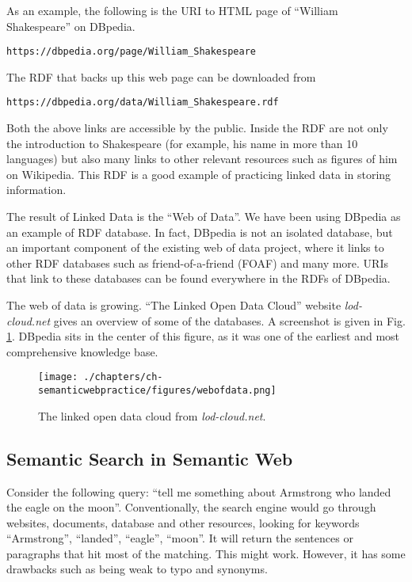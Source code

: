 As an example, the following is the URI to HTML page of ``William Shakespeare'' on DBpedia.
\begin{lstlisting}
https://dbpedia.org/page/William_Shakespeare
\end{lstlisting}
The RDF that backs up this web page can be downloaded from
\begin{lstlisting}
https://dbpedia.org/data/William_Shakespeare.rdf
\end{lstlisting}
Both the above links are accessible by the public. Inside the RDF are not only the introduction to Shakespeare (for example, his name in more than 10 languages) but also many links to other relevant resources such as figures of him on Wikipedia. This RDF is a good example of practicing linked data in storing information.

The result of Linked Data is the ``Web of Data''. We have been using DBpedia as an example of RDF database. In fact, DBpedia is not an isolated database, but an important component of the existing web of data project, where it links to other RDF databases such as friend-of-a-friend (FOAF) and many more. URIs that link to these databases can be found everywhere in the RDFs of DBpedia.

The web of data is growing. ``The Linked Open Data Cloud'' website \textit{lod-cloud.net} gives an overview of some of the databases. A screenshot is given in Fig. \ref{fig:webofdata}. DBpedia sits in the center of this figure, as it was one of the earliest and most comprehensive knowledge base. 
\begin{figure}[htbp]
	\centering
	\texttt{[image: ./chapters/ch-semanticwebpractice/figures/webofdata.png]}
	\caption{The linked open data cloud from \textit{lod-cloud.net}.}
	\label{fig:webofdata}
\end{figure}

\subsection{Semantic Search in Semantic Web}

Consider the following query: ``tell me something about Armstrong who landed the eagle on the moon''. Conventionally, the search engine would go through websites, documents, database and other resources, looking for keywords ``Armstrong'', ``landed'', ``eagle'', ``moon''. It will return the sentences or paragraphs that hit most of the matching. This might work. However, it has some drawbacks such as being weak to typo and synonyms.

